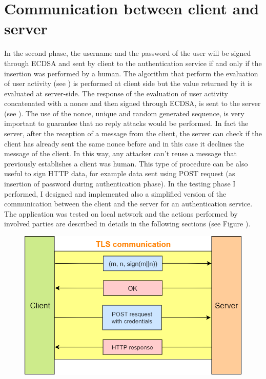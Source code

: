 \section{Communication between client and server}
In the second phase, the username and the password of the user will be signed through ECDSA and sent by client to the authentication service if and only if the insertion was performed by a human. The algorithm that perform the evaluation of user activity (see ) is performed at client side but the value returned by it is evaluated at server-side. The response of the evaluation of user activity concatenated with a nonce and then signed through ECDSA, is sent to the server (see ). The use of the nonce, unique and random generated sequence, is very important to guarantee that no reply attacks would be performed. In fact the server, after the reception of a message from the client, the server can check if the client has already sent the same nonce before and in this case it declines the message of the client. In this way, any attacker can't reuse a message that previously establishes a client was human. This type of procedure can be also useful to sign HTTP data, for example data sent using POST request (as insertion of password during authentication phase). In the testing phase I performed, I designed and implemented also a simplified version of the communication between the client and the server for an authentication service.\\
The application was tested on local network and the actions performed by involved parties are described in details in the following sections (see Figure ).
\begin{figure}
\centering
\includegraphics[width=.8\textwidth]{Images/AcCAPPCHA/client-server}
\end{figure}
